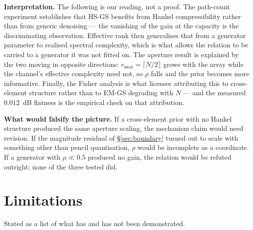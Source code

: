 \documentclass[journal]{IEEEtran}
\newcommand{\rmax}{r_{\max}}
\begin{document}
\textbf{Interpretation.} The following is our reading, not a proof. The
path-count experiment establishes that HS-GS benefits from Hankel
compressibility rather than from generic denoising --- the vanishing of the
gain at the capacity is the discriminating observation. Effective rank then
generalises that from a generator parameter to realised spectral complexity,
which is what allows the relation to be carried to a generator it was not
fitted on. The aperture result is explained by the two moving in opposite
directions: $\rmax=\lceil N/2\rceil$ grows with the array while the channel's
effective complexity need not, so $\rho$ falls and the prior becomes more
informative. Finally, the Fisher analysis is what licenses attributing this to
cross-element structure rather than to EM-GS degrading with $N$ --- and the
measured $0.012$~dB flatness is the empirical check on that attribution.

\textbf{What would falsify the picture.} If a cross-element prior with no
Hankel structure produced the same aperture scaling, the mechanism claim would
need revision. If the magnitude residual of \S\ref{sec:boundary} turned out to
scale with something other than pencil quantisation, $\rho$ would be incomplete
as a coordinate. If a generator with $\rho\ll0.5$ produced no gain, the
relation would be refuted outright; none of the three tested did.

\section{Limitations}\label{sec:limits}

Stated as a list of what has and has not been demonstrated.
\end{document}

